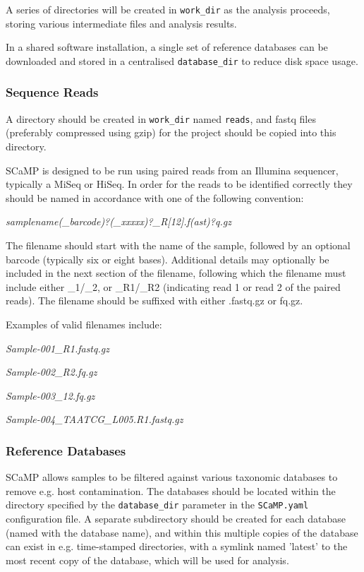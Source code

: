 \documentclass[a4paper,10pt]{article}
\newenvironment{tight_itemize}{
\begin{itemize}
  \setlength{\itemsep}{0pt}
  \setlength{\parskip}{0pt}
}{\end{itemize}}
\begin{document}
A series of directories will be created in {\tt work\_dir} as the analysis
proceeds, storing various intermediate files and analysis results. 

In a shared software installation, a single set of reference databases can be
downloaded and stored in a centralised {\tt database\_dir} to reduce disk space
usage. 

\subsubsection{Sequence Reads}

A directory should be created in {\tt work\_dir} named {\tt reads}, and fastq
files (preferably compressed using gzip) for the project should be copied into
this directory.

SCaMP is designed to be run using paired reads from an Illumina sequencer,
typically a MiSeq or HiSeq. In order for the reads to be identified correctly
they should be named in accordance with one of the following convention:

\textit{samplename(\_barcode)?(\_xxxxx)?\_R[12].f(ast)?q.gz}

The filename should start with the name of the sample, followed by an optional
barcode (typically six or eight bases). Additional details may optionally be
included in the next section of the filename, following which the filename must
include either \_1/\_2, or \_R1/\_R2 (indicating read 1 or read 2 of the paired
reads). The filename should be suffixed with either .fastq.gz or fq.gz.

Examples of valid filenames include:
\begin{tight_itemize}
\item \textit{Sample-001\_R1.fastq.gz}
\item \textit{Sample-002\_R2.fq.gz}
\item \textit{Sample-003\_12.fq.gz}
\item \textit{Sample-004\_TAATCG\_L005.R1.fastq.gz}
\end{tight_itemize}

\subsubsection{Reference Databases}

SCaMP allows samples to be filtered against various taxonomic databases to
remove e.g. host contamination. The databases should be located within the
directory specified by the {\tt database\_dir} parameter in the {\tt SCaMP.yaml}
configuration file. A separate subdirectory should be created for each database
(named with the database name), and within this multiple copies of the database
can exist in e.g. time-stamped directories, with a symlink named 'latest' to
the most recent copy of the database, which will be used for analysis.
\end{document}
